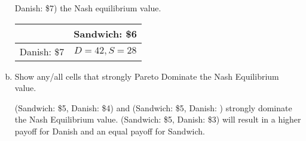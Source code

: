 \documentclass{math}
\begin{document}
\begin{enumerate}[(a)]
  Danish: \$7) the Nash equilibrium value.
  \begin{center}
    \begin{tabular}{|l||c|}
      \hline
      & Sandwich: \$6 \\ \hline
      \hline
      Danish: \$7 & $D=42, S=28$ \\
      \hline
    \end{tabular}
  \end{center}
  \item Show any/all cells that strongly Pareto Dominate the Nash Equilibrium
  value.
  \par (Sandwich: \$5, Danish: \$4) and (Sandwich: \$5, Danish: ) strongly
  dominate the Nash Equilibrium value. (Sandwich: \$5, Danish: \$3) will result
  in a higher payoff for Danish and an equal payoff for Sandwich.
\end{enumerate}
\end{document}
